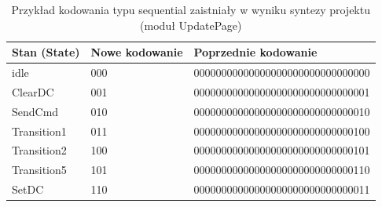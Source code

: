 \documentclass[12pt] {article}
\begin{document}
\begin{itemize}
\begin{table}[H]
\centering
\caption{Przykład kodowania typu sequential zaistniały w wyniku syntezy projektu (moduł UpdatePage)}
\begin{tabular}{@{}lll@{}} \\
\toprule
\rowcolor[HTML]{DAE8FC} 
\textbf{Stan (State)} & \textbf{Nowe kodowanie} & \textbf{Poprzednie kodowanie}    \\ \midrule
idle                  & 000                     & 00000000000000000000000000000000 \\
ClearDC               & 001                     & 00000000000000000000000000000001 \\
SendCmd               & 010                     & 00000000000000000000000000000010 \\
Transition1           & 011                     & 00000000000000000000000000000100 \\
Transition2           & 100                     & 00000000000000000000000000000101 \\
Transition5           & 101                     & 00000000000000000000000000000110 \\
SetDC                 & 110                     & 00000000000000000000000000000011 \\
\bottomrule  
\end{tabular}
\label{table:seq}
\end{table}
\end{itemize}
\end{document}
